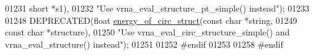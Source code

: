 \begin{DoxyCode}
01231                                    \textcolor{keywordtype}{short}      *s1),
01232            \textcolor{stringliteral}{"Use vrna\_eval\_structure\_pt\_simple() instead"});
01233 
01248 DEPRECATED(\textcolor{keywordtype}{float} \hyperlink{group__eval__deprecated_ga657222e2758c46bf13b416ef3032e417}{energy\_of\_circ\_struct}(\textcolor{keyword}{const} \textcolor{keywordtype}{char} *\textcolor{keywordtype}{string},
01249                                        \textcolor{keyword}{const} \textcolor{keywordtype}{char} *structure),
01250            \textcolor{stringliteral}{"Use vrna\_eval\_circ\_structure\_simple() and vrna\_eval\_structure() instead"});
01251 
01252 \textcolor{preprocessor}{#endif}
01253 
01258 \textcolor{preprocessor}{#endif}
\end{DoxyCode}
